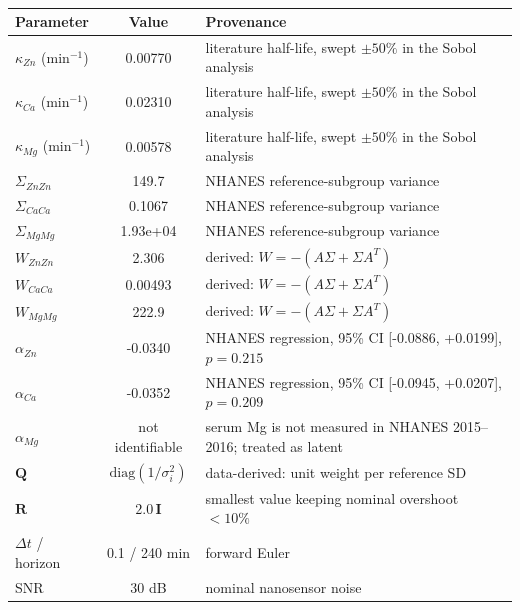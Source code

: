 \begin{table}[!t]
\centering
\caption{}
\label{tab:model}
{\scriptsize
\setlength{\tabcolsep}{3pt}
\begin{tabular}{|@{\,}l@{\,}|c|p{3.6cm}|}
\hline
\textbf{Parameter} & \textbf{Value} & \textbf{Provenance} \\ \hline
$\kappa_{Zn}$ (min$^{-1}$) & 0.00770 & literature half-life, swept $\pm 50\%$ in the Sobol analysis \\ \hline
$\kappa_{Ca}$ (min$^{-1}$) & 0.02310 & literature half-life, swept $\pm 50\%$ in the Sobol analysis \\ \hline
$\kappa_{Mg}$ (min$^{-1}$) & 0.00578 & literature half-life, swept $\pm 50\%$ in the Sobol analysis \\ \hline
$\Sigma_{ZnZn}$ & 149.7 & NHANES reference-subgroup variance \\ \hline
$\Sigma_{CaCa}$ & 0.1067 & NHANES reference-subgroup variance \\ \hline
$\Sigma_{MgMg}$ & 1.93e+04 & NHANES reference-subgroup variance \\ \hline
$W_{ZnZn}$ & 2.306 & derived: $W=-(A\Sigma+\Sigma A^{T})$ \\ \hline
$W_{CaCa}$ & 0.00493 & derived: $W=-(A\Sigma+\Sigma A^{T})$ \\ \hline
$W_{MgMg}$ & 222.9 & derived: $W=-(A\Sigma+\Sigma A^{T})$ \\ \hline
$\alpha_{Zn}$ & -0.0340 & NHANES regression, 95\% CI [-0.0886, +0.0199], $p=0.215$ \\ \hline
$\alpha_{Ca}$ & -0.0352 & NHANES regression, 95\% CI [-0.0945, +0.0207], $p=0.209$ \\ \hline
$\alpha_{Mg}$ & not identifiable & serum Mg is not measured in NHANES 2015--2016; treated as latent \\ \hline
$\mathbf{Q}$ & $\mathrm{diag}(1/\sigma_i^2)$ & data-derived: unit weight per reference SD \\ \hline
$\mathbf{R}$ & $2.0\,\mathbf{I}$ & smallest value keeping nominal overshoot $<10\%$ \\ \hline
$\Delta t$ / horizon & 0.1 / 240 min & forward Euler \\ \hline
SNR & 30 dB & nominal nanosensor noise \\ \hline
\end{tabular}}
\end{table}